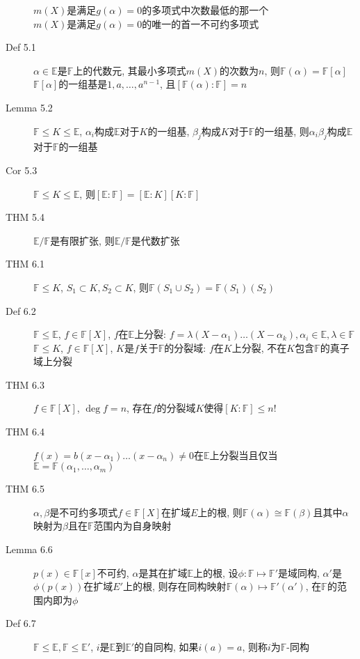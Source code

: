 \documentclass{article}
\begin{document}
\begin{description}
            $m(X)$是满足$g(\alpha) = 0$的多项式中次数最低的那一个\\
            $m(X)$是满足$g(\alpha) = 0$的唯一的首一不可约多项式
        \item[Def 5.1] $\alpha \in \mathbb E$是$\mathbb F$上的代数元, 其最小多项式$m(X)$的次数为$n$, 则$\mathbb F(\alpha) = \mathbb F[\alpha]$\\
            $\mathbb F[\alpha]$的一组基是$1, a, \dots, a^{n-1}$, 且$[\mathbb F(\alpha) : \mathbb F] = n$
        \item[Lemma 5.2] $\mathbb F \le K \le \mathbb E$, $\alpha_i$构成$\mathbb E$对于$K$的一组基, $\beta_j$构成$K$对于$\mathbb F$的一组基, 则$\alpha_i\beta_j$构成$\mathbb E$对于$\mathbb F$的一组基
        \item[Cor 5.3] $\mathbb F \le K \le \mathbb E$, 则$[\mathbb E : \mathbb F] = [\mathbb E : K][K : \mathbb F]$
        \item[THM 5.4] $\mathbb E/\mathbb F$是有限扩张, 则$\mathbb E/\mathbb F$是代数扩张
        \item[THM 6.1] $\mathbb F \le K$, $S_1 \subset K, S_2 \subset K$, 则$\mathbb F(S_1 \cup S_2) = \mathbb F(S_1)(S_2)$
        \item[Def 6.2] $\mathbb F \le \mathbb E$, $f \in \mathbb F[X]$, $f$在$\mathbb E$上分裂: $f = \lambda(X-\alpha_1) \dots (X-\alpha_k), \alpha_i \in \mathbb E, \lambda \in \mathbb F$\\
            $\mathbb F \le K$, $f \in \mathbb F[X]$, $K$是$f$关于$\mathbb F$的分裂域: $f$在$K$上分裂, 不在$K$包含$\mathbb F$的真子域上分裂
        \item[THM 6.3] $f \in \mathbb F[X]$, $\deg f = n$, 存在$f$的分裂域$K$使得$[K:\mathbb F] \le n!$
        \item[THM 6.4] $f(x) = b(x - \alpha_1)\dots(x - \alpha_n) \ne 0$在$\mathbb E$上分裂当且仅当$\mathbb E = \mathbb F(\alpha_1, \dots, \alpha_m)$
        \item[THM 6.5] $\alpha, \beta$是不可约多项式$f \in \mathbb F[X]$在扩域$E$上的根, 则$\mathbb F(\alpha) \cong \mathbb F(\beta)$且其中$\alpha$映射为$\beta$且在$\mathbb F$范围内为自身映射
        \item[Lemma 6.6] $p(x) \in \mathbb F[x]$不可约, $\alpha$是其在扩域$\mathbb E$上的根, 设$\phi: \mathbb F \mapsto \mathbb F'$是域同构, $\alpha'$是$\phi(p(x))$在扩域$E'$上的根, 则存在同构映射$\mathbb F(\alpha) \mapsto \mathbb F'(\alpha')$, 在$\mathbb F$的范围内即为$\phi$
        \item[Def 6.7] $\mathbb F \le \mathbb E, \mathbb F \le \mathbb E'$, $i$是$\mathbb E$到$\mathbb E'$的自同构, 如果$i(a) = a$, 则称$i$为$\mathbb F$-同构

\end{description}
\end{document}
